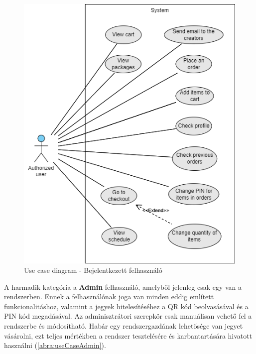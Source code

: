 \begin{figure}[!h]
	\centering
	\includegraphics[scale=0.7]{images/useCaseA}
	\caption{Use case diagram - Bejelentkezett felhasználó}
	\label{abra:useCaseA}
\end{figure}
\pagebreak

A harmadik kategória a \textbf{Admin} felhasználó, amelyből jelenleg csak egy van a rendszerben. Ennek a felhasználónak joga van minden eddig említett funkcionalitáshoz, valamint a jegyek hitelesítéséhez a QR kód beolvasásával és a PIN kód megadásával. Az adminisztrátori szerepkör csak manuálisan vehető fel a rendszerbe és módosítható. Habár egy rendszergazdának lehetősége van jegyet vásárolni, ezt teljes mértékben a rendszer tesztelésére és karbantartására hivatott használni (\ref{abra:useCaseAdmin}).


